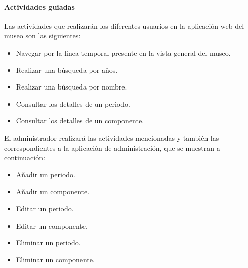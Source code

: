 \paragraph*{Actividades guiadas}
Las actividades que realizarán los diferentes usuarios en la aplicación web del museo son las siguientes:
\begin{itemize}
\item Navegar por la linea temporal presente en la vista general del museo.
\item Realizar una búsqueda por años.
\item Realizar una búsqueda por nombre.
\item Consultar los detalles de un periodo.
\item Consultar los detalles de un componente.
\end{itemize}
El administrador realizará las actividades mencionadas y también las correspondientes a la aplicación de administración, que se muestran a continuación:
\begin{itemize}
\item Añadir un periodo.
\item Añadir un componente.
\item Editar un periodo.
\item Editar un componente.
\item Eliminar un periodo.
\item Eliminar un componente.
\end{itemize}

